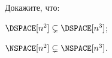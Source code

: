 Докажите, что:
\begin{enumcyr}
    \item $\DSPACE[n^2] \subsetneq \DSPACE[n^3]$;
    \item $\NSPACE[n^2] \subsetneq \NSPACE[n^3]$.
\end{enumcyr}